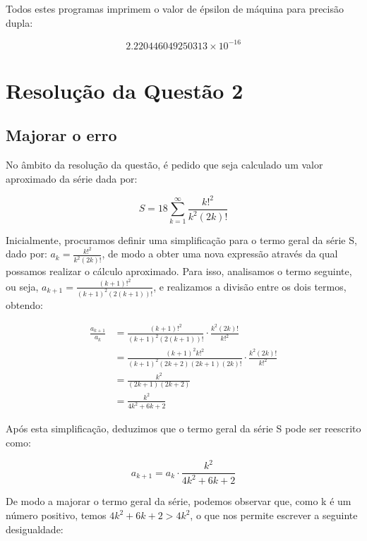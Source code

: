 \documentclass{article}
\begin{document}
\noindent
Todos estes programas imprimem o valor de épsilon de máquina para
precisão dupla:
\bigskip

\textbf{\[ 2.220446049250313 \times 10^{-16} \]}

\pagebreak

\section{Resolução da Questão 2}
\smallskip

\subsection{Majorar o erro}

No âmbito da resolução da questão, é pedido que seja calculado 
um valor aproximado da série dada por:

\begin{equation}
    S = 18 \sum_{k=1}^{\infty} \frac{k!^2}{k^2 (2k)!}
\end{equation}
\medskip

\noindent
Inicialmente, procuramos definir uma simplificação para o termo 
geral da série S, dado por: $a_k = \frac{k!^2}{k^2 (2k)!}$, de modo 
a obter uma nova expressão através da qual possamos realizar o 
cálculo aproximado. Para isso, analisamos o termo seguinte, ou seja, 
$a_{k+1} = \frac{(k+1)!^2}{(k+1)^2 (2(k+1))!}$, e realizamos a 
divisão entre os dois termos, obtendo:

\begin{align*}
    \frac{a_{k+1}}{a_k} &= \frac{(k+1)!^2}{(k+1)^2 (2(k+1))!} \cdot \frac{k^2 (2k)!}{k!^2} \\
    &= \frac{(k+1)^2 k!^2}{(k+1)^2 (2k+2)(2k+1)(2k)!} \cdot \frac{k^2 (2k)!}{k!^2} \\
    &= \frac{k^2}{(2k+1)(2k+2)} \\
    &= \frac{k^2}{4k^2 + 6k + 2}
\end{align*}
\medskip

\noindent
Após esta simplificação, deduzimos que o termo geral da série S 
pode ser reescrito como:

\begin{equation}
    a_{k+1} = a_k \cdot \frac{k^2}{4k^2 + 6k + 2}
\end{equation}
\bigskip

\noindent
De modo a majorar o termo geral da série, podemos observar que, 
como k é um número positivo, temos $4k^2 + 6k + 2 > 4k^2$, o que 
nos permite escrever a seguinte desigualdade:
\medskip
\end{document}
